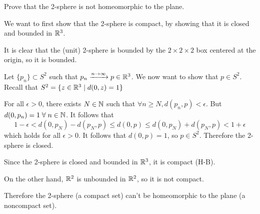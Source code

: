 \documentclass[a4paper, 12pt]{article}
\begin{document}
\begin{problem} [2.56]
Prove that the 2-sphere is not homeomorphic to the plane.
\end{problem}
\begin{solution}
    We want to first show that the 2-sphere is compact, by showing that it is closed and bounded in $\mathbb{R}^3$.

    It is clear that the (unit) 2-sphere is bounded by the $2 \times 2 \times 2$ box centered at the origin, so it is bounded.

    Let $\{p_n\} \subset S^2$ such that $p_n \xrightarrow{n \to \infty} p \in \mathbb{R}^3$. We now want to show that $p \in S^2$. Recall that $S^2 = \{z \in \mathbb{R}^3 \mid d(0, z) = 1\}$

    For all $\epsilon > 0$, there exists $N \in \mathbb{N}$ such that $\forall n \geq N, d(p_n, p) < \epsilon$. But $d(0, p_n) = 1 \forall n \in \bbn$. It follows that \[
        1 - \epsilon < d(0, p_N) - d(p_N, p) \leq d(0, p) \leq d(0, p_N) + d(p_N, p) < 1 + \epsilon
    \]
    which holds for all $\epsilon > 0$. It follows that $d(0, p) = 1$, so $p \in S^2$. Therefore the 2-sphere is closed.

    Since the 2-sphere is closed and bounded in $\mathbb{R}^3$, it is compact (H-B).

    On the other hand, $\mathbb{R}^2$ is unbounded in $\mathbb{R}^2$, so it is not compact.

    Therefore the 2-sphere (a compact set) can't be homeomorphic to the plane (a noncompact set).
\end{solution}
\end{document}
